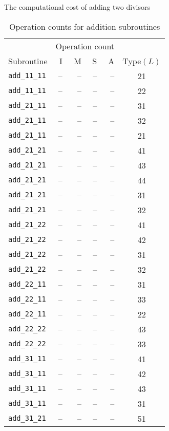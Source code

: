 The computational cost of adding two divisors
\begin{longtable}{|l|rrrr|c|}
  \caption{Operation counts for addition subroutines\label{tab_addition_costs}}\\
  \hline
  & \multicolumn{4}{c|}{Operation count} & \\
  Subroutine & I & M & S & A & Type$(L)$ \\
  \hline  
  {\tt add\_11\_11}  & -- & -- & -- & -- & 21 \\
  {\tt add\_11\_11}  & -- & -- & -- & -- & 22 \\
  \hline  
  {\tt add\_21\_11}  & -- & -- & -- & -- & 31 \\
  {\tt add\_21\_11}  & -- & -- & -- & -- & 32 \\
  {\tt add\_21\_11}  & -- & -- & -- & -- & 21 \\
  \hline
  {\tt add\_21\_21}  & -- & -- & -- & -- & 41 \\
  {\tt add\_21\_21}  & -- & -- & -- & -- & 43 \\
  {\tt add\_21\_21}  & -- & -- & -- & -- & 44 \\
  {\tt add\_21\_21}  & -- & -- & -- & -- & 31 \\
  {\tt add\_21\_21}  & -- & -- & -- & -- & 32 \\
  \hline
  {\tt add\_21\_22}  & -- & -- & -- & -- & 41 \\
  {\tt add\_21\_22}  & -- & -- & -- & -- & 42 \\
  {\tt add\_21\_22}  & -- & -- & -- & -- & 31 \\
  {\tt add\_21\_22}  & -- & -- & -- & -- & 32 \\
  \hline
  {\tt add\_22\_11}  & -- & -- & -- & -- & 31 \\
  {\tt add\_22\_11}  & -- & -- & -- & -- & 33 \\
  {\tt add\_22\_11}  & -- & -- & -- & -- & 22 \\
  \hline
  {\tt add\_22\_22}  & -- & -- & -- & -- & 43 \\
  {\tt add\_22\_22}  & -- & -- & -- & -- & 33 \\
  \hline
  {\tt add\_31\_11}  & -- & -- & -- & -- & 41 \\
  {\tt add\_31\_11}  & -- & -- & -- & -- & 42 \\
  {\tt add\_31\_11}  & -- & -- & -- & -- & 43 \\
  {\tt add\_31\_11}  & -- & -- & -- & -- & 31 \\
  \hline
  {\tt add\_31\_21}  & -- & -- & -- & -- & 51 \\

\end{longtable}
